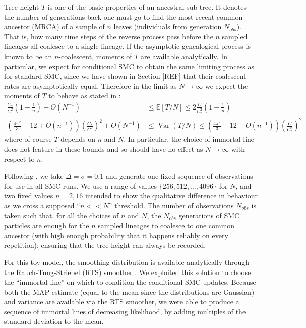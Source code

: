 \documentclass{article}
\newcommand{\E}{\mathbb{E}}
\newcommand{\V}{\operatorname{Var}}
\begin{document}
Tree height $T$ is one of the basic properties of an ancestral sub-tree. It denotes the number of generations back one must go to find the most recent common ancestor (MRCA) of a sample of $n$ leaves (individuals from generation $N_{obs}$). That is, how many time steps of the reverse process pass before the $n$ sampled lineages all coalesce to a single lineage. If the asymptotic genealogical process is known to be an $n$-coalescent, moments of $T$ are available analytically. In particular, we expect for conditional SMC to obtain the same limiting process as for standard SMC, since we have shown in Section [REF] that their coalescent rates are asymptotically equal. Therefore in the limit as $N\to\infty$ we expect the moments of $T$ to behave as stated in \citet[Corollary 1]{koskela2018}:
\begin{align*}
\frac{C_*}{C^2} \left(1-\frac{1}{n}\right) + O(N^{-1}) &\leq \E[T/N] \leq 2\frac{C}{C_*^2} \left(1-\frac{1}{n}\right) \\
\left(\frac{4\pi^2}{3} - 12 + O(n^{-1})\right) \left(\frac{C_*}{C^2}\right)^2 + O(N^{-1}) &\leq \V(T/N) \leq \left(\frac{4\pi^2}{3} - 12 + O(n^{-1})\right) \left(\frac{C}{C_*^2}\right)^2
\end{align*}
where of course $T$ depends on $n$ and $N$. In particular, the choice of immortal line does not feature in these bounds and so should have no effect as $N \to\infty$ with respect to $n$.

Following \citet{koskela2018}, we take $\Delta = \sigma = 0.1$ and generate one fixed sequence of observations for use in all SMC runs.
We use a range of values $\{256, 512, \dots, 4096\}$ for $N$, and two fixed values $n=2,16$ intended to show the qualitative difference in behaviour as we cross a supposed ``$n<<N$'' threshold.
The number of observations $N_{obs}$ is taken such that, for all the choices of $n$ and $N$, the $N_{obs}$ generations of SMC particles are enough for the $n$ sampled lineages to coalesce to one common ancestor (with high enough probability that it happens reliably on every repetition); ensuring that the tree height can always be recorded.

For this toy model, the smoothing distribution is available analytically through the Rauch-Tung-Striebel (RTS) smoother \citep{rauch1965}. We exploited this solution to choose the ``immortal line'' on which to condition the conditional SMC updates. Because both the MAP estimate (equal to the mean since the distributions are Gaussian) and variance are available via the RTS smoother, we were able to produce a sequence of immortal lines of decreasing likelihood, by adding multiples of the standard deviation to the mean.
\end{document}

